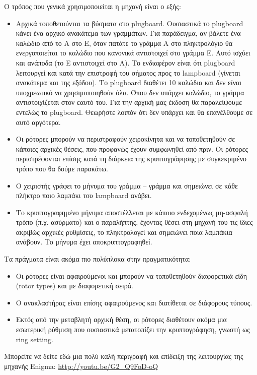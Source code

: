 \documentclass[a4paper,twoside,12pt]{article}
\begin{document}
Ο τρόπος που γενικά χρησιμοποιείται η μηχανή είναι ο εξής:

\begin{itemize}
\item Αρχικά τοποθετούνται τα βύσματα στο plugboard. Ουσιαστικά το plugboard κάνει ένα αρχικό ανακάτεμα των γραμμάτων. Για παράδειγμα, αν βάλετε ένα καλώδιο από το Α στο Ε, όταν πατάτε το γράμμα Α στο πληκτρολόγιο θα ενεργοποιείται το καλώδιο που κανονικά αντιστοιχεί στο γράμμα Ε. Αυτό ισχύει και ανάποδα (το Ε αντιστοιχεί στο Α). Το ενδιαφέρον είναι ότι plugboard λειτουργεί και κατά την επιστροφή του σήματος προς το lampboard (γίνεται ανακάτεμα και της εξόδου). Το plugboard διαθέτει 10 καλώδια και δεν είναι υποχρεωτικό να χρησιμοποιηθούν όλα. Όπου δεν υπάρχει καλώδιο, το γράμμα αντιστοιχίζεται στον εαυτό του. Για την αρχική μας έκδοση θα παραλείψουμε εντελώς το plugboard. Θεωρήστε λοιπόν ότι δεν υπάρχει και θα επανέλθουμε σε αυτό αργότερα.
\item Οι ρότορες μπορούν να περιστραφούν χειροκίνητα και να τοποθετηθούν σε κάποιες αρχικές θέσεις, που προφανώς έχουν συμφωνηθεί από πριν. Οι ρότορες περιστρέφονται επίσης κατά τη διάρκεια της κρυπτογράφησης με συγκεκριμένο τρόπο που θα δούμε παρακάτω.
\item Ο χειριστής γράφει το μήνυμα του γράμμα – γράμμα και σημειώνει σε κάθε πλήκτρο ποιο λαμπάκι του lampboard ανάβει.
\item Το κρυπτογραφημένο μήνυμα αποστέλλεται με κάποιο ενδεχομένως μη-ασφαλή τρόπο (π.χ. ασύρματο) και ο παραλήπτης, έχοντας θέσει στη μηχανή του τις ίδιες ακριβώς αρχικές ρυθμίσεις, το πληκτρολογεί και σημειώνει ποια λαμπάκια ανάβουν. Το μήνυμα έχει αποκρυπτογραφηθεί.
\end{itemize}

Τα πράγματα είναι ακόμα πιο πολύπλοκα στην πραγματικότητα:

\begin{itemize}
\item Οι ρότορες είναι αφαιρούμενοι και μπορούν να τοποθετηθούν διαφορετικά είδη (rotor types) και με διαφορετική σειρά.
\item Ο ανακλαστήρας είναι επίσης αφαιρούμενος και διατίθεται σε διάφορους τύπους.
\item Εκτός από την μεταβλητή αρχική θέση, οι ρότορες διαθέτουν ακόμα μια εσωτερική ρύθμιση που ουσιαστικά μετατοπίζει την κρυπτογράφηση, γνωστή ως ring setting.
\end{itemize}

Μπορείτε να δείτε εδώ μια πολύ καλή περιγραφή και επίδειξη της λειτουργίας της μηχανής Enigma: \url{http://youtu.be/G2_Q9FoD-oQ} 
\end{document}
